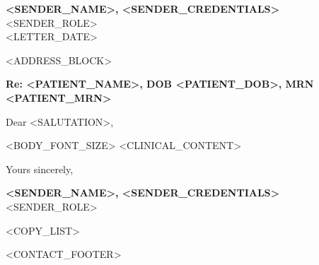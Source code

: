 \documentclass[a4paper,11pt]{article}
\begin{document}
\begin{flushright}
    \textbf{<SENDER_NAME>, <SENDER_CREDENTIALS>}\\
    <SENDER_ROLE>\\
    \vspace{3mm}
    <LETTER_DATE>
\end{flushright}

\vspace{10mm}

<ADDRESS_BLOCK>

\vspace{15mm}

\noindent
\textbf{Re: <PATIENT_NAME>, DOB <PATIENT_DOB>, MRN <PATIENT_MRN>}\\

\vspace{10mm}

\noindent
Dear <SALUTATION>,

\vspace{5mm}

<BODY_FONT_SIZE>
\noindent
<CLINICAL_CONTENT>

\vspace{10mm}

\noindent
Yours sincerely,

\vspace{15mm}

\noindent
\textbf{<SENDER_NAME>, <SENDER_CREDENTIALS>}\\
<SENDER_ROLE>

\vspace{10mm}

<COPY_LIST>

\vspace{\fill}

<CONTACT_FOOTER>
\end{document}

